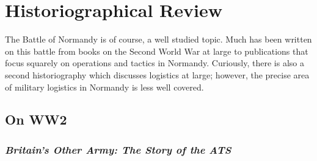 \documentclass[noraggedright]{turabian-researchpaper}
\begin{document}
\section{Historiographical Review}







The Battle of Normandy is of course, a well studied topic.  Much has been
written on this battle from books on the Second World War at large to 
publications that focus squarely on operations and tactics in Normandy.
Curiously, there is also a second historiography which discusses logistics
at large; however, the precise area of military logistics in Normandy is
less well covered. 

	\subsection{On WW2} %
		\subsubsection{\textit{Britain's Other Army:  The Story of
			the ATS}}
\end{document}
